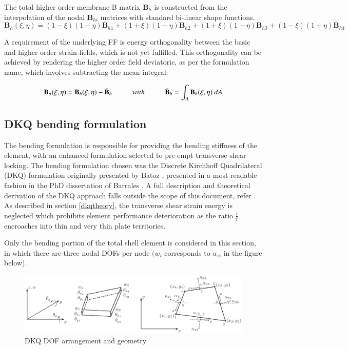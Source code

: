 The total higher order membrane B matrix $\mathbf{B}_h$ is constructed from the interpolation of the nodal $\mathbf{B}_{hi}$ matrices with standard bi-linear shape functions.
\begin{equation} 
\mathbf{B}_h(\xi,\eta) = (1-\xi)(1-\eta)\mathbf{B}_{h1} + (1+\xi)(1-\eta)\mathbf{B}_{h2} + (1+\xi)(1+\eta)\mathbf{B}_{h3} +	(1-\xi)(1+\eta)\mathbf{B}_{h4} 
\label{equation19}
\end{equation}

A requirement of the underlying FF is energy orthogonality between the basic and higher order strain fields, which is not yet fulfilled. This orthogonality can be achieved by rendering the higher order field deviatoric, as per the formulation name, which involves subtracting the mean integral:

\begin{equation} 
\mathbf{B}_d(\xi,\eta) = \mathbf{B}_h(\xi,\eta) - \bar{\mathbf{B}}_h
\hspace{10mm}
with
\hspace{10mm}
\bar{\mathbf{B}}_h = \int_A \mathbf{B}_h(\xi,\eta) \ dA
\label{eqnAndesDevB}
\end{equation}

\subsection{DKQ bending formulation}
\label{section:DKQ bending formulation}

The bending formulation is responsible for providing the bending stiffness of the element, with an enhanced formulation selected to pre-empt transverse shear locking. The bending formulation chosen was the Discrete Kirchhoff Quadrilateral (DKQ) formulation  originally presented by Batoz \cite{Bat82}, presented in a most readable fashion in the PhD dissertation of Barrales \cite{Bar12}. A full description and theoretical derivation of the DKQ approach falls outside the scope of this document, refer \cite{Bat82}. As described in section \ref{dkqtheory}, the transverse shear strain energy is neglected which prohibits element performance deterioration as the ratio $\frac{l}{t}$ encroaches into thin and very thin plate territories.

Only the bending portion of the total shell element is considered in this section, in which there are three nodal DOFs per node $(w_i$ corresponds to $u_{zi}$ in the figure below).

\begin{figure}[H]
	\centering
	\def\svgwidth{\columnwidth}
	\includegraphics[width=15cm]{images/8nodeseren.png}
	\caption{DKQ DOF arrangement and geometry \cite{Bar12}}
	\label{8nodeseren}
\end{figure}

